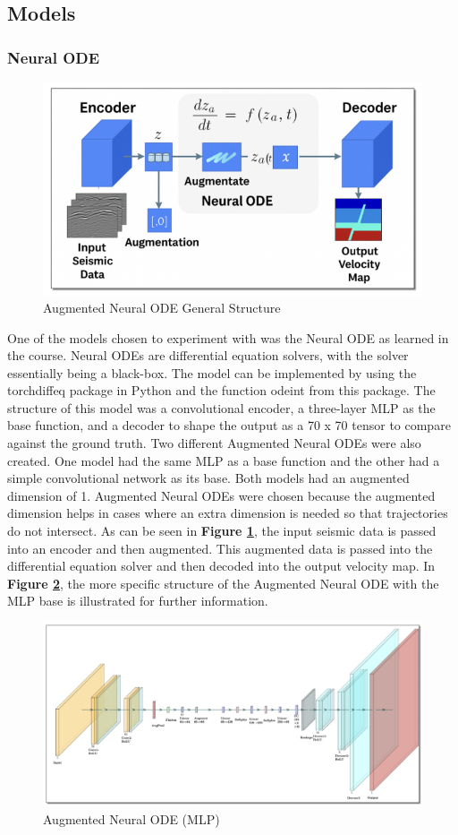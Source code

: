 \documentclass{article}
\begin{document}
\subsection{Models}
\subsubsection{Neural ODE}
\begin{figure}[H]
    \centering
    \includegraphics[width=0.5\linewidth]{figures/neuralode_structure.png}
    \caption{Augmented Neural ODE General Structure}
    \label{fig:neuralode_structure}
\end{figure}
One of the models chosen to experiment with was the Neural ODE as learned in the course. Neural ODEs are differential equation solvers, with the solver essentially being a black-box. The model can be implemented by using the torchdiffeq package in Python and the function odeint from this package. The structure of this model was a convolutional encoder, a three-layer MLP as the base function, and a decoder to shape the output as a 70 x 70 tensor to compare against the ground truth. Two different Augmented Neural ODEs were also created. One model had the same MLP as a base function and the other had a simple convolutional network as its base. Both models had an augmented dimension of 1. Augmented Neural ODEs were chosen because the augmented dimension helps in cases where an extra dimension is needed so that trajectories do not intersect. As can be seen in \textbf{Figure \ref{fig:neuralode_structure}}, the input seismic data is passed into an encoder and then augmented. This augmented data is passed into the differential equation solver and then decoded into the output velocity map. In \textbf{Figure \ref{fig:aug-neuralode-mlp}}, the more specific structure of the Augmented Neural ODE with the MLP base is illustrated for further information.
\begin{figure}[H]
    \centering
    \includegraphics[width=0.5\linewidth]{figures/augmented_neuralode.png}
    \caption{Augmented Neural ODE (MLP)}
    \label{fig:aug-neuralode-mlp}
\end{figure} 
\end{document}
